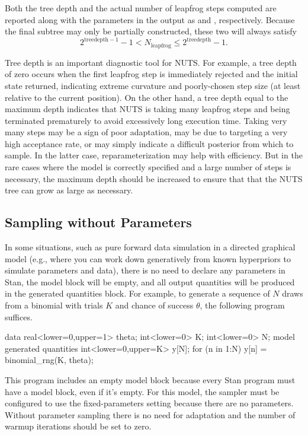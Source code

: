 Both the tree depth and the actual number of leapfrog steps computed
are reported along with the parameters in the output as
 and , respectively. Because
the final subtree may only be partially constructed, these two will
always satisfy
%
\[
2^{\mathrm{treedepth} - 1} - 1 < N_{\mathrm{leapfrog}} \le 2^{\mathrm{treedepth} } - 1.
\]

Tree depth is an important diagnostic tool for NUTS. For example, a
tree depth of zero occurs when the first leapfrog step is immediately
rejected and the initial state returned, indicating extreme curvature
and poorly-chosen step size (at least relative to the current
position). On the other hand, a tree depth equal to the maximum depth
indicates that NUTS is taking many leapfrog steps and being terminated
prematurely to avoid excessively long execution time. Taking very many
steps may be a sign of poor adaptation, may be due to targeting a very
high acceptance rate, or may simply indicate a difficult posterior
from which to sample. In the latter case, reparameterization may help
with efficiency. But in the rare cases where the model is correctly
specified and a large number of steps is necessary, the maximum depth
should be increased to ensure that that the NUTS tree can grow as
large as necessary.


\subsection{Sampling without Parameters}

In some situations, such as pure forward data simulation in a directed
graphical model (e.g., where you can work down generatively from known
hyperpriors to simulate parameters and data), there is no need to
declare any parameters in Stan, the model block will be empty, and all
output quantities will be produced in the generated quantities block.
For example, to generate a sequence of $N$ draws from a binomial with
trials $K$ and chance of success $\theta$, the following program suffices.
%
\begin{stancode}
data {
  real<lower=0,upper=1> theta;
  int<lower=0> K;
  int<lower=0> N;
}
model {
}
generated quantities {
  int<lower=0,upper=K> y[N];
  for (n in 1:N)
    y[n] = binomial_rng(K, theta);
}
\end{stancode}
%
This program includes an empty model block because every Stan program
must have a model block, even if it's empty.  For this model, the
sampler must be configured to use the fixed-parameters setting because
there are no parameters.  Without parameter sampling there is no need
for adaptation and the number of warmup iterations should be set to
zero.

